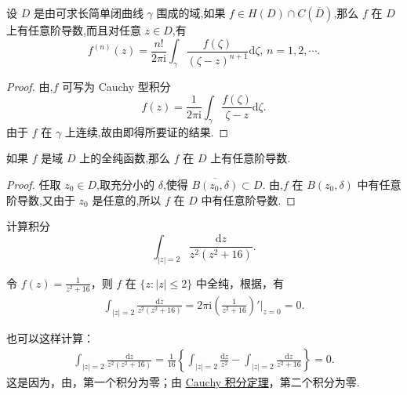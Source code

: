 \documentclass[../../main.tex]{subfiles}
\begin{document}
\begin{theorem}\label{theorem:定理3.4.3}
设 \( D \) 是由可求长简单闭曲线 \( \gamma \) 围成的域,如果 \( f \in H(D) \cap C(\overline{D}) \),那么 \( f \) 在 \( D \) 上有任意阶导数,而且对任意 \( z \in D \),有
\[
f^{(n)}(z) = \frac{n!}{2\pi \mathrm{i}} \int_{\gamma} \frac{f(\zeta)}{(\zeta - z)^{n + 1}} \mathrm{d}\zeta, \, n = 1, 2, \cdots.
\]
\end{theorem}
\begin{proof}
由,\( f \) 可写为 Cauchy 型积分
\[
f(z) = \frac{1}{2\pi \mathrm{i}} \int_{\gamma} \frac{f(\zeta)}{\zeta - z} \mathrm{d}\zeta.
\]
由于 \( f \) 在 \( \gamma \) 上连续,故由即得所要证的结果. 
\end{proof}

\begin{theorem}\label{theorem:定理3.4.4}
如果 \( f \) 是域 \( D \) 上的全纯函数,那么 \( f \) 在 \( D \) 上有任意阶导数.
\end{theorem}
\begin{proof}
任取 \( z_0 \in D \),取充分小的 \( \delta \),使得 \( \overline{B(z_0, \delta)} \subset D \). 由,\( f \) 在 \( B(z_0, \delta) \) 中有任意阶导数,又由于 \( z_0 \) 是任意的,所以 \( f \) 在 \( D \) 中有任意阶导数. 
\end{proof}

\begin{example}
计算积分
\[
\int_{|z| = 2} \frac{\mathrm{d}z}{z^2(z^2 + 16)}.
\]
\end{example}
\begin{solution}
令 \( f(z) = \frac{1}{z^2 + 16} \)，则 \( f \) 在 \( \{z: |z| \leqslant 2\} \) 中全纯，根据，有
\begin{align*}
\int_{|z| = 2} \frac{\mathrm{d}z}{z^2(z^2 + 16)} = 2\pi \mathrm{i} \left( \frac{1}{z^2 + 16} \right)' \bigg|_{z = 0} = 0.
\end{align*}

也可以这样计算：
\begin{align*}
\int_{|z| = 2} \frac{\mathrm{d}z}{z^2(z^2 + 16)} = \frac{1}{16} \left\{ \int_{|z| = 2} \frac{\mathrm{d}z}{z^2} - \int_{|z| = 2} \frac{\mathrm{d}z}{z^2 + 16} \right\} = 0.
\end{align*}
这是因为，由，第一个积分为零；由 \hyperref[theorem:Cauchy-Goursat定理(Cauchy积分定理)]{Cauchy 积分定理}，第二个积分为零. 
\end{solution}
\end{document}
